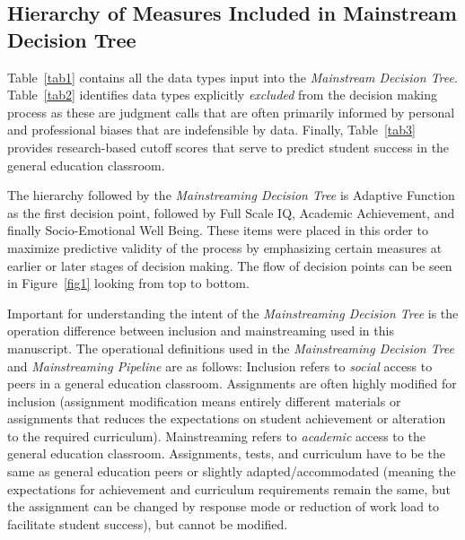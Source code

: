 \documentclass[twoside]{article}
\begin{document}
\subsection{Hierarchy of Measures Included in Mainstream Decision Tree}
Table~\ref{tab1} contains all the data types input into the \textit{Mainstream Decision Tree}. Table~\ref{tab2} identifies data types explicitly \textit{excluded} from the decision making process as these are judgment calls that are often primarily informed by personal and professional biases that are indefensible by data. Finally, Table~\ref{tab3} provides research-based cutoff scores that serve to predict student success in the general education classroom.

The hierarchy followed by the \textit{Mainstreaming Decision Tree} is Adaptive Function as the first decision point, followed by Full Scale IQ, Academic Achievement, and finally Socio-Emotional Well Being. These items were placed in this order to maximize predictive validity of the process by emphasizing certain measures at earlier or later stages of decision making. The flow of decision points can be seen in Figure~\ref{fig1} looking from top to bottom.

Important for understanding the intent of the \textit{Mainstreaming Decision Tree} is the operation difference between inclusion and mainstreaming used in this manuscript. The operational definitions used in the \textit{Mainstreaming Decision Tree} and \textit{Mainstreaming Pipeline} are as follows:  Inclusion refers to \textit{social} access to peers in a general education classroom. Assignments are often highly modified for inclusion (assignment modification means entirely different materials or assignments that reduces the expectations on student achievement or alteration to the required curriculum). Mainstreaming refers to \textit{academic} access to the general education classroom. Assignments, tests, and curriculum have to be the same as  general education peers or slightly adapted/accommodated (meaning the expectations for achievement and curriculum requirements remain the same, but the assignment can be changed by response mode or reduction of work load to facilitate student success), but cannot be modified.
\end{document}
